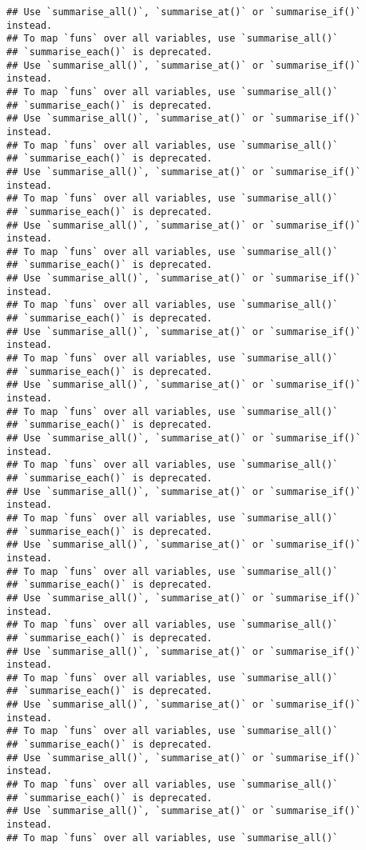 \documentclass[]{article}
\begin{document}
\begin{verbatim}
## Use `summarise_all()`, `summarise_at()` or `summarise_if()` instead.
## To map `funs` over all variables, use `summarise_all()`
## `summarise_each()` is deprecated.
## Use `summarise_all()`, `summarise_at()` or `summarise_if()` instead.
## To map `funs` over all variables, use `summarise_all()`
## `summarise_each()` is deprecated.
## Use `summarise_all()`, `summarise_at()` or `summarise_if()` instead.
## To map `funs` over all variables, use `summarise_all()`
## `summarise_each()` is deprecated.
## Use `summarise_all()`, `summarise_at()` or `summarise_if()` instead.
## To map `funs` over all variables, use `summarise_all()`
## `summarise_each()` is deprecated.
## Use `summarise_all()`, `summarise_at()` or `summarise_if()` instead.
## To map `funs` over all variables, use `summarise_all()`
## `summarise_each()` is deprecated.
## Use `summarise_all()`, `summarise_at()` or `summarise_if()` instead.
## To map `funs` over all variables, use `summarise_all()`
## `summarise_each()` is deprecated.
## Use `summarise_all()`, `summarise_at()` or `summarise_if()` instead.
## To map `funs` over all variables, use `summarise_all()`
## `summarise_each()` is deprecated.
## Use `summarise_all()`, `summarise_at()` or `summarise_if()` instead.
## To map `funs` over all variables, use `summarise_all()`
## `summarise_each()` is deprecated.
## Use `summarise_all()`, `summarise_at()` or `summarise_if()` instead.
## To map `funs` over all variables, use `summarise_all()`
## `summarise_each()` is deprecated.
## Use `summarise_all()`, `summarise_at()` or `summarise_if()` instead.
## To map `funs` over all variables, use `summarise_all()`
## `summarise_each()` is deprecated.
## Use `summarise_all()`, `summarise_at()` or `summarise_if()` instead.
## To map `funs` over all variables, use `summarise_all()`
## `summarise_each()` is deprecated.
## Use `summarise_all()`, `summarise_at()` or `summarise_if()` instead.
## To map `funs` over all variables, use `summarise_all()`
## `summarise_each()` is deprecated.
## Use `summarise_all()`, `summarise_at()` or `summarise_if()` instead.
## To map `funs` over all variables, use `summarise_all()`
## `summarise_each()` is deprecated.
## Use `summarise_all()`, `summarise_at()` or `summarise_if()` instead.
## To map `funs` over all variables, use `summarise_all()`
## `summarise_each()` is deprecated.
## Use `summarise_all()`, `summarise_at()` or `summarise_if()` instead.
## To map `funs` over all variables, use `summarise_all()`
## `summarise_each()` is deprecated.
## Use `summarise_all()`, `summarise_at()` or `summarise_if()` instead.
## To map `funs` over all variables, use `summarise_all()`

\end{verbatim}
\end{document}
